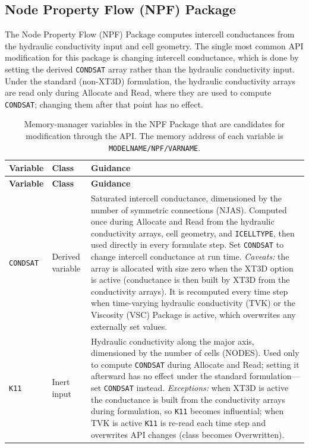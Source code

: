 \subsection{Node Property Flow (NPF) Package}

The Node Property Flow (NPF) Package computes intercell conductances from the
hydraulic conductivity input and cell geometry. The single most common API
modification for this package is changing intercell conductance, which is done
by setting the derived \texttt{CONDSAT} array rather than the hydraulic
conductivity input. Under the standard (non-XT3D) formulation, the hydraulic
conductivity arrays are read only during Allocate and Read, where they are used
to compute \texttt{CONDSAT}; changing them after that point has no effect.

\begin{longtable}{p{} p{} p{}}
\caption{Memory-manager variables in the NPF Package that are candidates for
modification through the API. The memory address of each variable is
\texttt{MODELNAME/NPF/VARNAME}.} \label{table:api-gwf-npf} \\

\hline
\textbf{Variable} & \textbf{Class} & \textbf{Guidance} \\
\hline
\endfirsthead

\hline
\textbf{Variable} & \textbf{Class} & \textbf{Guidance} \\
\hline
\endhead

\texttt{CONDSAT} & Derived variable &
Saturated intercell conductance, dimensioned by the number of symmetric
connections (NJAS). Computed once during Allocate and Read from the hydraulic
conductivity arrays, cell geometry, and \texttt{ICELLTYPE}, then used directly
in every formulate step. Set \texttt{CONDSAT} to change intercell conductance at
run time. \emph{Caveats:} the array is allocated with size zero when the XT3D
option is active (conductance is then built by XT3D from the conductivity
arrays). It is recomputed every time step when time-varying hydraulic
conductivity (TVK) or the Viscosity (VSC) Package is active, which overwrites any
externally set values. \\

\texttt{K11} & Inert input &
Hydraulic conductivity along the major axis, dimensioned by the number of cells
(NODES). Used only to compute \texttt{CONDSAT} during Allocate and Read; setting
it afterward has no effect under the standard formulation---set \texttt{CONDSAT}
instead. \emph{Exceptions:} when XT3D is active the conductance is built from the
conductivity arrays during formulation, so \texttt{K11} becomes influential; when
TVK is active \texttt{K11} is re-read each time step and overwrites API changes
(class becomes Overwritten). \\


\end{longtable}
